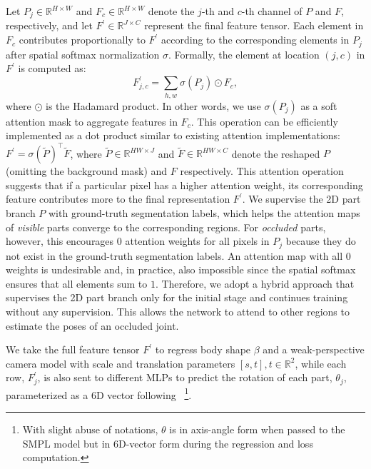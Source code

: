 \documentclass[10pt,twocolumn,letterpaper,usenames,dvipsnames]{article}
\newcommand{\real}{\mathbb{R}}
\begin{document}
Let $P_j \in \mathbb{R}^{H\times W}$ and $F_c \in \mathbb{R}^{H\times W}$ denote the $j$-th and $c$-th channel of $P$ and $F$, respectively, and let $F^\prime \in \mathbb{R}^{J\times C}$ represent the final feature tensor. 
Each element in $F_c$ contributes proportionally to $F^\prime$ according to the corresponding elements in $P_j$ after spatial softmax normalization $\sigma$. 
Formally, the element at location $(j,c)$ in $F^\prime$ is computed as:
\begin{equation}
\label{eq-softattention}
F^\prime_{j,c}= \sum_{h,w} \sigma(P_j) \odot F_c,
\end{equation}
where $\odot$ is the Hadamard product. 
In other words, we use $\sigma(P_j)$ as a soft attention mask to aggregate features in $F_c$.
This operation can be efficiently implemented as a dot product similar to existing attention implementations: $F^{\prime} = \sigma( \tilde{P})^{\top}\tilde{F}$, where $\tilde{P} \in \mathbb{R}^{HW \times J}$ and $\tilde{F} \in \mathbb{R}^{HW \times C}$ denote the reshaped $P$ (omitting the background mask) and $F$ respectively. This attention operation suggests that if a particular pixel has a higher attention weight, its corresponding feature contributes more to the final representation $F^{\prime}$. 
We supervise the 2D part branch $P$ with ground-truth segmentation labels, which helps the attention maps of \emph{visible} parts converge to the corresponding regions.
For \emph{occluded} parts, however, this encourages $0$ attention weights for all pixels in $P_j$ because they do not exist in the ground-truth segmentation labels. 
An attention map with all $0$ weights is undesirable and, in practice, also impossible since the spatial softmax ensures that all elements sum to $1$.
Therefore, we adopt a hybrid approach that supervises the 2D part branch only for the initial stage and continues training without any supervision. This allows the network to attend to other regions to estimate the poses of an occluded joint.

We take the full feature tensor $ F^\prime$ to regress body shape $\beta$ and a weak-perspective camera model with scale and translation parameters $[s,t], t \in \real^2$, while each row, $ F^\prime_j$, is also sent to different MLPs to predict the rotation of each part, $\theta_j$, parameterized as a 6D vector following~\cite{kocabas2019vibe,SPIN:ICCV:2019} \footnote{With slight abuse of notations, $\theta$ is in axis-angle form when passed to the SMPL model but in 6D-vector form during the regression and loss computation.}.
\end{document}

